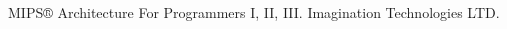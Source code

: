 \documentclass[black,normal,cn,hide]{elegantbook}
\begin{document}
\tableofcontents
\mainmatter





\newpage
\renewcommand{\bibname}{参考文献}
\begin{thebibliography}{99}
	 MIPS® Architecture For Programmers I, II, III. Imagination Technologies LTD.  
\end{thebibliography}
\end{document}

